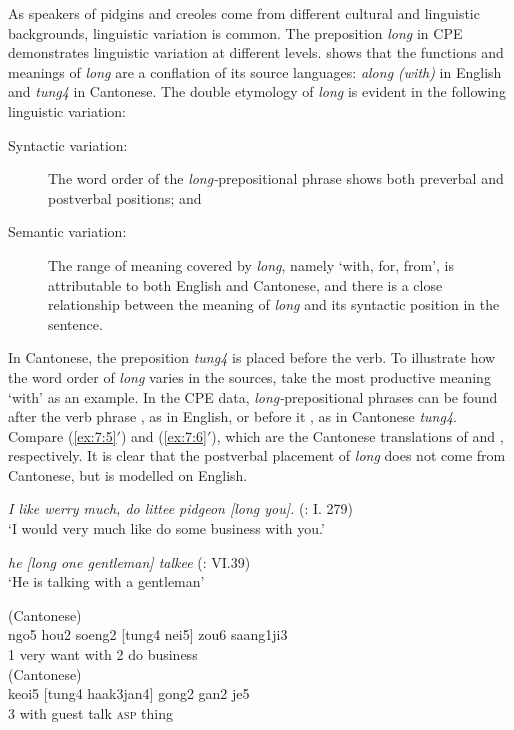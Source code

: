 \documentclass[english,output=paper,colorlinks,citecolor=brown]{../langscibook}
\begin{document}
As speakers of pidgins and creoles come from different cultural and linguistic backgrounds, linguistic variation is common. The preposition \textit{long} in CPE demonstrates linguistic variation at different levels. \citet{Li2011} shows that the functions and meanings of \textit{long} are a conflation of its source languages: \textit{along (with)} in English and \textit{tung4} in Cantonese. The double etymology of \textit{long} is evident in the following linguistic variation:

\begin{description}
\item [Syntactic variation:] The word order of the \textit{long-}prepositional phrase shows both preverbal and postverbal positions; and 
\item [Semantic variation:] The range of meaning covered by \textit{long}, namely ‘with, for, from’, is attributable to both English and Cantonese, and there is a close relationship between the meaning of \textit{long} and its syntactic position in the sentence.
\end{description}

In Cantonese, the preposition \textit{tung4} is placed before the verb. To illustrate how the word order of \textit{long} varies in the sources, take the most productive meaning ‘with’ as an example. In the CPE data, \textit{long-}prepositional phrases can be found after the verb phrase , as in English, or before it , as in Cantonese \textit{tung4}. Compare (\ref{ex:7:5}$'$) and (\ref{ex:7:6}$'$), which are the Cantonese translations of  and , respectively. It is clear that the postverbal placement of \textit{long} does not come from Cantonese, but is modelled on English. 

\ea%
    \label{ex:7:5}
\textit{I like werry much, do littee pidgeon [long you].} (\citealt{Downing1838}: I. 279)\\
\glt ‘I would very much like do some business with you.’ 

\ex%
    \label{ex:7:6}
\textit{he [long one gentleman] talkee} (\citealt{Tong1862}: VI.39)\\
\glt ‘He is talking with a gentleman’ 

 (Cantonese)\\
\gll ngo5  hou2  soeng2   [tung4   nei5]  zou6  saang1ji3\\
1    very   want    with      2    do   business\\
 (Cantonese)\\
keoi5  [tung4    haak3jan4]  gong2   gan2   je5\\
3  with        guest    talk   \textsc{asp}  thing
\z
\end{document}
